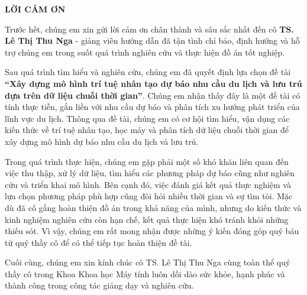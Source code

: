 
\thispagestyle{empty}
\begin{center}
	{\fontsize{14pt}{18pt}\selectfont \textbf{LỜI CẢM ƠN}}\\[20pt]
\end{center}

Trước hết, chúng em xin gửi lời cảm ơn chân thành và sâu sắc nhất đến cô \textbf{TS. Lê Thị Thu Nga} - giảng viên hướng dẫn đã tận tình chỉ bảo, định hướng và hỗ trợ chúng em trong suốt quá trình nghiên cứu và thực hiện đồ án tốt nghiệp.

Sau quá trình tìm hiểu và nghiên cứu, chúng em đã quyết định lựa chọn đề tài \textbf{``Xây dựng mô hình trí tuệ nhân tạo dự báo nhu cầu du lịch và lưu trú dựa trên dữ liệu chuỗi thời gian''}. Chúng em nhận thấy đây là một đề tài có tính thực tiễn, gắn liền với nhu cầu dự báo và phân tích xu hướng phát triển của lĩnh vực du lịch. Thông qua đề tài, chúng em có cơ hội tìm hiểu, vận dụng các kiến thức về trí tuệ nhân tạo, học máy và phân tích dữ liệu chuỗi thời gian để xây dựng mô hình dự báo nhu cầu du lịch và lưu trú.

Trong quá trình thực hiện, chúng em gặp phải một số khó khăn liên quan đến việc thu thập, xử lý dữ liệu, tìm hiểu các phương pháp dự báo cũng như nghiên cứu và triển khai mô hình. Bên cạnh đó, việc đánh giá kết quả thực nghiệm và lựa chọn phương pháp phù hợp cũng đòi hỏi nhiều thời gian và sự tìm tòi. Mặc dù đã cố gắng hoàn thiện đồ án trong khả năng của mình, nhưng do kiến thức và kinh nghiệm nghiên cứu còn hạn chế, kết quả thực hiện khó tránh khỏi những thiếu sót. Vì vậy, chúng em rất mong nhận được những ý kiến đóng góp quý báu từ quý thầy cô để có thể tiếp tục hoàn thiện đề tài.


Cuối cùng, chúng em xin kính chúc cô TS. Lê Thị Thu Nga cùng toàn thể quý thầy cô trong Khoa Khoa học Máy tính luôn dồi dào sức khỏe, hạnh phúc và thành công trong công tác giảng dạy và nghiên cứu.


\newpage